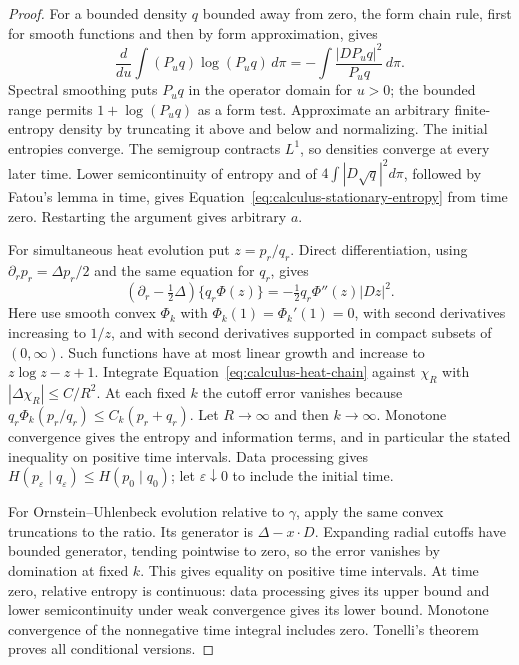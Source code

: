\begin{proof}
For a bounded density $q$ bounded away from zero, the form chain
rule, first for smooth functions and then by form approximation,
gives
\[
 \frac{d}{du}\int(P_uq)\log(P_uq)\,d\pi
 =-\int\frac{|DP_uq|^2}{P_uq}\,d\pi.
\]
Spectral smoothing puts $P_uq$ in the operator domain for $u>0$;
the bounded range permits $1+\log(P_uq)$ as a form test.
Approximate an arbitrary finite-entropy density by truncating it
above and below and normalizing. The initial entropies converge.
The semigroup contracts $L^1$, so densities converge at every
later time. Lower semicontinuity of entropy and of
$4\int|D\sqrt q|^2d\pi$, followed by Fatou's lemma in time,
gives Equation~\eqref{eq:calculus-stationary-entropy} from time zero.
Restarting the argument gives arbitrary $a$.

For simultaneous heat evolution put $z=p_r/q_r$. Direct
differentiation, using $\partial_r p_r=\Delta p_r/2$ and the
same equation for $q_r$, gives
\begin{equation}\label{eq:calculus-heat-chain}
 (\partial_r-\tfrac12\Delta)\{q_r\Phi(z)\}
 =-\tfrac12q_r\Phi''(z)|Dz|^2.
\end{equation}
Here use smooth convex $\Phi_k$ with
$\Phi_k(1)=\Phi_k'(1)=0$, with second derivatives increasing to
$1/z$, and with second derivatives supported in compact subsets
of $(0,\infty)$. Such functions have at most linear growth and
increase to $z\log z-z+1$. Integrate
Equation~\eqref{eq:calculus-heat-chain} against $\chi_R$ with
$|\Delta\chi_R|\le C/R^2$. At each fixed $k$ the cutoff error
vanishes because $q_r\Phi_k(p_r/q_r)\le C_k(p_r+q_r)$.
Let $R\to\infty$ and then $k\to\infty$. Monotone convergence
gives the entropy and information terms, and in particular the
stated inequality on positive time intervals. Data processing
gives $H(p_\varepsilon\mid q_\varepsilon)\le H(p_0\mid q_0)$;
let $\varepsilon\downarrow0$ to include the initial time.

For Ornstein--Uhlenbeck evolution relative to $\gamma$, apply
the same convex truncations to the ratio. Its generator is
$\Delta-x\cdot D$. Expanding radial cutoffs have bounded
generator, tending pointwise to zero, so the error vanishes by
domination at fixed $k$. This gives equality on positive time
intervals. At time zero, relative entropy is continuous: data
processing gives its upper bound and lower semicontinuity under
weak convergence gives its lower bound. Monotone convergence of
the nonnegative time integral includes zero. Tonelli's theorem
proves all conditional versions.
\end{proof}

